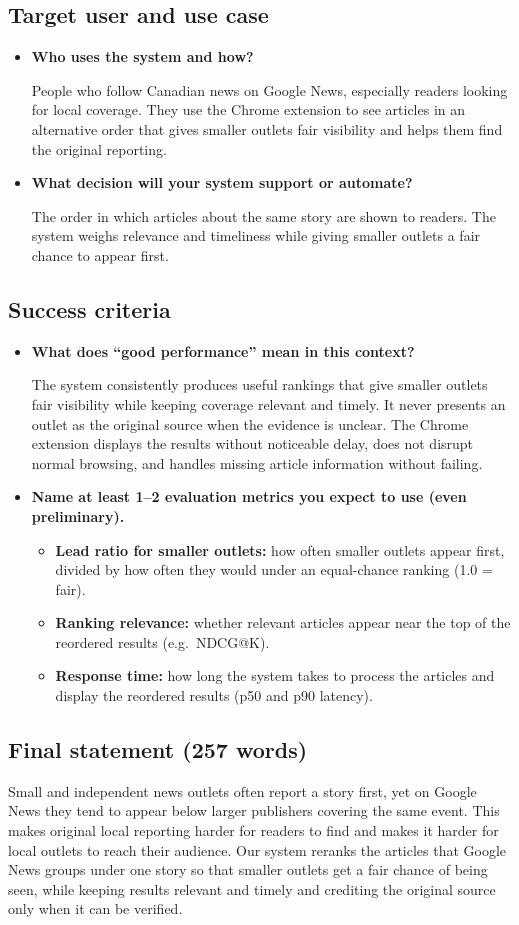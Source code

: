 \documentclass[11pt,letterpaper]{article}
\newcommand{\q}[1]{\item \textbf{#1}\par}
\begin{document}
\subsection*{Target user and use case}
\begin{itemize}
\q{Who uses the system and how?}
People who follow Canadian news on Google News, especially readers looking for local coverage. They use the Chrome extension to see articles in an alternative order that gives smaller outlets fair visibility and helps them find the original reporting.

\q{What decision will your system support or automate?}
The order in which articles about the same story are shown to readers. The system weighs relevance and timeliness while giving smaller outlets a fair chance to appear first.
\end{itemize}

\subsection*{Success criteria}
\begin{itemize}
\q{What does ``good performance'' mean in this context?}
The system consistently produces useful rankings that give smaller outlets fair visibility while keeping coverage relevant and timely. It never presents an outlet as the original source when the evidence is unclear. The Chrome extension displays the results without noticeable delay, does not disrupt normal browsing, and handles missing article information without failing.

\q{Name at least 1--2 evaluation metrics you expect to use (even preliminary).}
\begin{itemize}
\item \textbf{Lead ratio for smaller outlets:} how often smaller outlets appear first, divided by how often they would under an equal-chance ranking (1.0 = fair).
\item \textbf{Ranking relevance:} whether relevant articles appear near the top of the reordered results (e.g.\ NDCG@K).
\item \textbf{Response time:} how long the system takes to process the articles and display the reordered results (p50 and p90 latency).
\end{itemize}
\end{itemize}

\subsection*{Final statement (257 words)}
Small and independent news outlets often report a story first, yet on Google News they tend to appear below larger publishers covering the same event. This makes original local reporting harder for readers to find and makes it harder for local outlets to reach their audience. Our system reranks the articles that Google News groups under one story so that smaller outlets get a fair chance of being seen, while keeping results relevant and timely and crediting the original source only when it can be verified.
\end{document}
